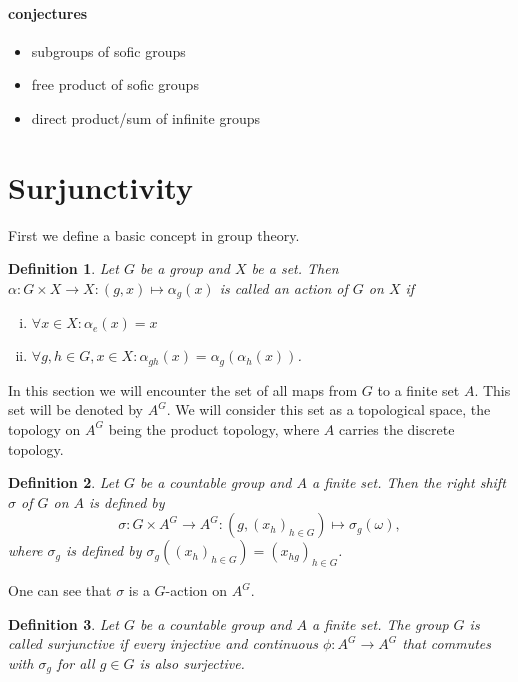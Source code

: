 \documentclass[titlepage, a4paper]{article}
\newtheorem{definition}{Definition}
\theoremstyle{remark}
\begin{document}
    \paragraph{conjectures}
    \begin{itemize}
        \item subgroups of sofic groups
        \item free product of sofic groups
        \item direct product/sum of infinite groups
    \end{itemize}

 

    \section{Surjunctivity}\label{sec:surjunctivity}

    First we define a basic concept in group theory.

    \begin{definition} %
        Let $G$ be a group and $X$ be a set. Then $\alpha: G \times X \to X: (g,x) \mapsto \alpha_g(x)$ is called an action of $G$ on $X$ if
        \begin{enumerate}[(i)]
            \item $\forall x \in X: \alpha_e(x) = x$
            \item $\forall g,h \in G, x\in X: \alpha_{gh}(x) = \alpha_g(\alpha_h(x))$.
        \end{enumerate}
    \end{definition}

    In this section we will encounter the set of all maps from $G$ to a finite set $A$. This set will be denoted by $A^G$. We will consider this set as a topological space, the topology on $A^G$ being the product topology, where $A$ carries the discrete topology.

    \begin{definition}
        Let $G$ be a countable group and $A$ a finite set. Then the right shift $\sigma$ of $G$ on $A$ is defined by
        \[
        \sigma: G \times A^G \to A^G: \left(g, (x_{h})_{h \in G} \right) \mapsto \sigma_g(\omega),
        \]
        where $\sigma_g$ is defined by $\sigma_g\left( (x_{h})_{h \in G} \right) = \left( x_{hg} \right)_{h \in G}$. %
    \end{definition}

    One can see that $\sigma$ is a $G$-action on $A^G$.
    \begin{definition}
        Let $G$ be a countable group and $A$ a finite set. The group $G$ is called surjunctive if every injective and continuous $\phi: A^{G}\to A^{G}$ that commutes with $\sigma_g$ for all $g \in G$ is also surjective.
    \end{definition}
\end{document}
